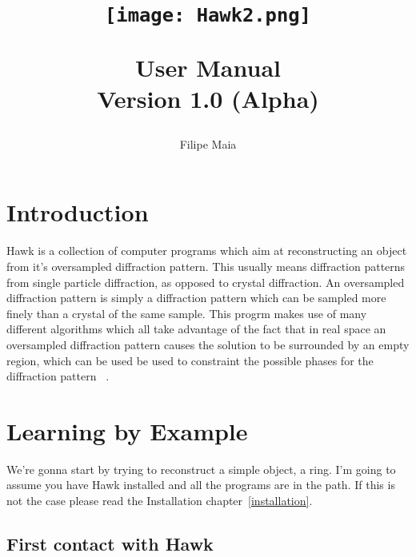 \documentclass{report}
\begin{document}
\title{
\begin{figure}[!h]
\centering
\texttt{[image: Hawk2.png]}
\label{hawk-cover}
\end{figure}
\vspace {1.0in}
{User Manual} \\ Version 1.0 (Alpha) }
\author {Filipe Maia}

\maketitle

\parindent=0pt 
\baselineskip=18pt 
\lineskip=0pt

\tableofcontents

\pagestyle{headings}

\def\delfo{$\delta_{fo}$~}
\def\delfc{$\delta_{fc}$~}
\def\qq{\qquad\qquad}
\def\hbar{\overline{h}}



\chapter{Introduction} 
\label{intro}

\vspace {0.1in}

Hawk is a collection of computer programs which aim at reconstructing an object from 
it's oversampled  diffraction pattern. This usually means diffraction patterns from 
single particle diffraction, as opposed to crystal diffraction. An oversampled diffraction
 pattern is simply a diffraction pattern which can be sampled more finely than a crystal
 of the same sample. This progrm makes use of many different algorithms which all take
 advantage of the fact that in real space an oversampled diffraction pattern causes 
the solution to be surrounded by an empty region, which can be used be used to 
constraint the possible phases for the diffraction pattern ~\cite{Miao2000}.

\chapter{Learning by Example}
\label{tutorial}


We're gonna start by trying to reconstruct a simple object, a ring. I'm going
 to assume you have Hawk installed and all the programs are in the path. If
 this is not the case please read the Installation chapter~\ref{installation}.

\section{First contact with Hawk}
\label{tutorial-ring}
\end{document}

